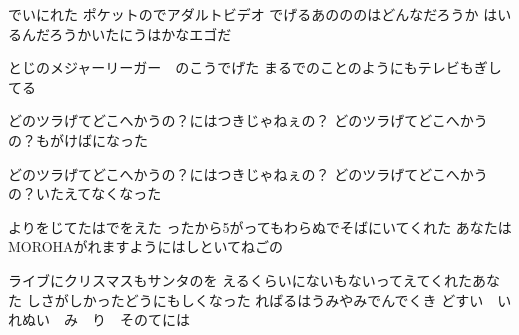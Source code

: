 \documentclass{article}
\newenvironment{Japanese}{%
\CJKfamily{min}%
\CJKtilde
\CJKnospace}{}
\begin{document}
\begin{CJK}{UTF8}{}
\begin{Japanese}
\begin{songs}{}
でいにれた ポケットのでアダルトビデオ
でげるあのののはどんなだろうか
はいるんだろうかいたにうはかなエゴだ

とじのメジャーリーガー　のこうでげた
まるでのことのようにもテレビもぎしてる

どのツラげてどこへかうの？にはつきじゃねぇの？
どのツラげてどこへかうの？もがけばになった

どのツラげてどこへかうの？にはつきじゃねぇの？
どのツラげてどこへかうの？いたえてなくなった

よりをじてたはでをえた
ったから5がってもわらぬでそばにいてくれた
あなたはMOROHAがれますようにはしといてねごの

ライブにクリスマスもサンタのを
えるくらいにないもないってえてくれたあなた
しさがしかったどうにもしくなった
ればるはうみやみでんでくき
どすい　い　れぬい　み　り　そのてには


\end{songs}
\end{Japanese}
\end{CJK}
\end{document}
